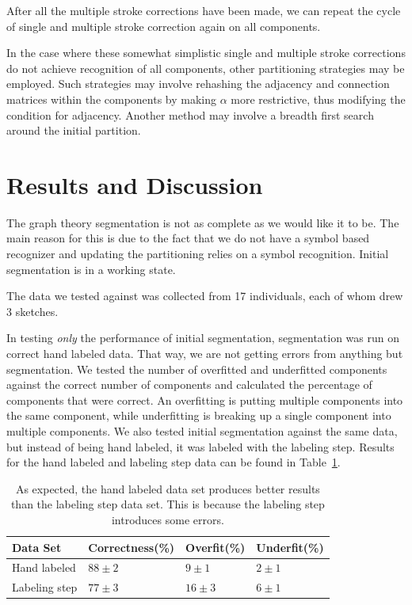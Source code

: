 \documentclass[10pt]{acmsiggraph}               %
\begin{document}
After all the multiple stroke corrections have been made, we can repeat the cycle of single and multiple stroke correction again on all components.

In the case where these somewhat simplistic single and multiple stroke corrections do not achieve recognition of all components, other partitioning strategies may be employed. Such strategies may involve rehashing the adjacency and connection matrices within the components by making $\alpha$ more restrictive, thus modifying the condition for adjacency. Another method may involve a breadth first search around the initial partition.

\section{Results and Discussion}
The graph theory segmentation is not as complete as we would like it to be.
The main reason for this is due to the fact that we do not have a symbol based recognizer and updating the partitioning relies on a symbol recognition.
Initial segmentation is in a working state.

The data we tested against was collected from 17 individuals, each of whom drew 3 sketches.

In testing \emph{only} the performance of initial segmentation, segmentation was run on correct hand labeled data.
That way, we are not getting errors from anything but segmentation.
We tested the number of overfitted and underfitted components against the correct number of components and calculated the percentage of components that were correct.
An overfitting is putting multiple components into the same component, while underfitting is breaking up a single component into multiple components.
We also tested initial segmentation against the same data, but instead of being hand labeled, it was labeled with the labeling step.
Results for the hand labeled and labeling step data can be found in Table~\ref{table:results1}.

\begin{table}[h]
\begin{tabular}{|p{1.9cm}|p{2.1cm}p{1.5cm}p{1.6cm}|}
	\hline
Data Set 				&  Correctness(\%)		& Overfit(\%) 		& Underfit(\%)  \\
	\hline
Hand labeled   	& $88 \pm 2$					& $9 \pm 1$						& $2 \pm 1$ \\
Labeling step 	 	& $77 \pm 3$					& $16 \pm 3$			 & $6 \pm 1$ \\
	\hline
\end{tabular}
\caption{As expected, the hand labeled data set produces better results than the labeling step data set.  This is because the labeling step introduces some errors.}
\label{table:results1}
\end{table}
\end{document}
